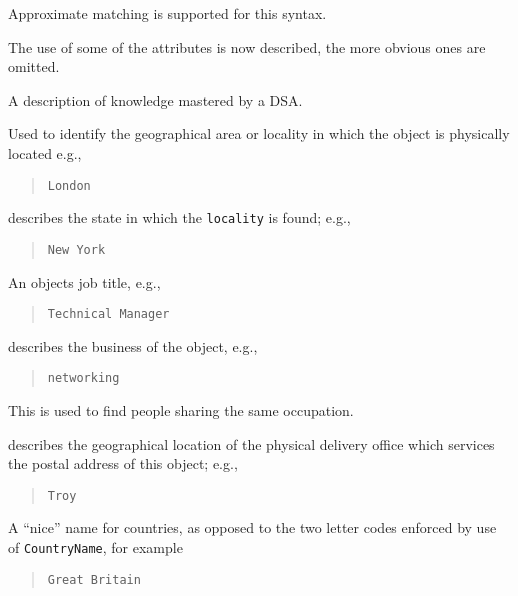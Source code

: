 Approximate matching is supported for this syntax.

The use of some of the attributes is now described, the more obvious ones
are omitted.

\begin{describe}
\item [\verb+knowledgeInformation+:] A description of knowledge mastered by a DSA.
\item [\verb+localityName+:] Used to identify the geographical area or locality in
which the object is physically located e.g., 
\small\begin{quote}\begin{verbatim}
London
\end{verbatim}\end{quote}
\item [\verb+stateOrProvinceName+:]
			describes the state in which
			the \verb"locality" is found; e.g., 
\small\begin{quote}\begin{verbatim}
New York
\end{verbatim}\end{quote}
\item [\verb+title+:]
An objects job title, e.g.,
\small\begin{quote}\begin{verbatim}
Technical Manager
\end{verbatim}\end{quote}

\item [\verb+businessCategory+:]
describes the business of the object, e.g.,
\small\begin{quote}\begin{verbatim}
networking
\end{verbatim}\end{quote}

This is used to find people sharing the same occupation.

\item [\verb+physicalDeliveryOfficeName+:]
			describes the geographical location
			of the physical delivery office which services the
			postal address of this object; e.g.,
\small\begin{quote}\begin{verbatim}
Troy
\end{verbatim}\end{quote}

\item [\verb+friendlyCountryName+:]
A ``nice'' name for countries, as opposed to the two letter codes enforced by
use of \verb+CountryName+, for example
\small\begin{quote}\begin{verbatim}
Great Britain
\end{verbatim}\end{quote}

\end{describe}




